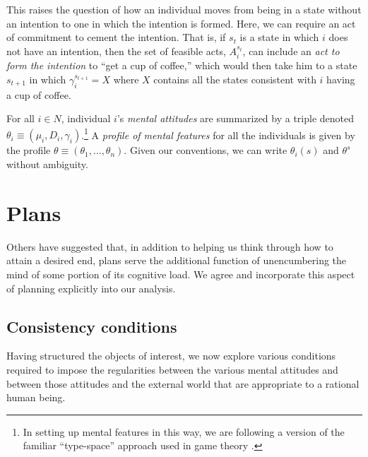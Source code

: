 \documentclass[
11pt,
titlepage,
reqno,
]{article}%
\theoremstyle{definition}
\begin{document}
	This raises the question of how an individual moves from being in a state without an intention to one in which the intention is formed. 
	Here, we can require an act of commitment to cement the intention. 
	That is, if $s_t$ is a state in which $i$ does not have an intention, then the set of feasible acts, $A^{s_t}_i$, can include an \textit{act to form the intention} to ``get a cup of coffee,'' which would then take him to a state $s_{t+1}$ in which $\gamma_i^{s_{t+1}}=X$ where $X$ contains all the states consistent with $i$ having a cup of coffee.
	
	For all $i\in N$, individual $i$'s \textit{mental attitudes} are summarized by a triple denoted $\theta_i\equiv(\mu_i,D_i,\gamma_i)$.\footnote
	{
		In setting up mental features in this way, we are following a version of the familiar ``type-space'' approach used in game theory \citep[See][]{Harsanyi1967, Mertens1985a}. 
	} 
	A \textit{profile of mental features} for all the individuals is given by the profile $\theta\equiv(\theta_1,\ldots,\theta_n)$. 
	Given our conventions, we can write $\theta_i(s)$ and $\theta^s$ without ambiguity.
	
	
\section{Plans}
	Others have suggested that, in addition to helping us think through how to attain a desired end, plans serve the additional function of unencumbering the mind of some portion of its cognitive load. 
	We agree and incorporate this aspect of planning explicitly into our analysis.
	
	
	\subsection{Consistency conditions\label{sec:consistencies}}
	
	Having structured the objects of interest, we now explore various conditions required to impose the regularities between the various mental attitudes and between those attitudes and the external world that are appropriate to a rational human being. 
	
\end{document}

